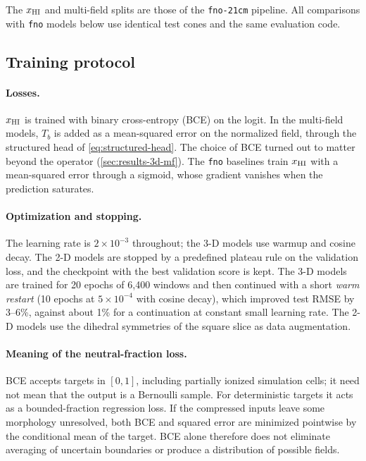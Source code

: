 The $x_{\mathrm{HI}}$ and multi-field splits are those of the \texttt{fno-21cm} pipeline. All comparisons with \texttt{fno} models below use identical test cones and the same evaluation code.

\subsection{Training protocol}
\label{sec:training}

\paragraph{Losses.} $x_{\mathrm{HI}}$ is trained with binary cross-entropy (BCE) on the logit. In the multi-field models, $T_b$ is added as a mean-squared error on the normalized field, through the structured head of \cref{eq:structured-head}. The choice of BCE turned out to matter beyond the operator (\cref{sec:results-3d-mf}). The \texttt{fno} baselines train $x_{\mathrm{HI}}$ with a mean-squared error through a sigmoid, whose gradient vanishes when the prediction saturates.

\paragraph{Optimization and stopping.} The learning rate is $2\times10^{-3}$ throughout; the 3-D models use warmup and cosine decay. The 2-D models are stopped by a predefined plateau rule on the validation loss, and the checkpoint with the best validation score is kept. The 3-D models are trained for 20 epochs of 6,400 windows and then continued with a short \emph{warm restart} (10 epochs at $5\times10^{-4}$ with cosine decay), which improved test RMSE by 3--6\%, against about 1\% for a continuation at constant small learning rate. The 2-D models use the dihedral symmetries of the square slice as data augmentation.

\paragraph{Meaning of the neutral-fraction loss.} BCE accepts targets in $[0,1]$, including partially ionized simulation cells; it need not mean that the output is a Bernoulli sample. For deterministic targets it acts as a bounded-fraction regression loss. If the compressed inputs leave some morphology unresolved, both BCE and squared error are minimized pointwise by the conditional mean of the target. BCE alone therefore does not eliminate averaging of uncertain boundaries or produce a distribution of possible fields.

